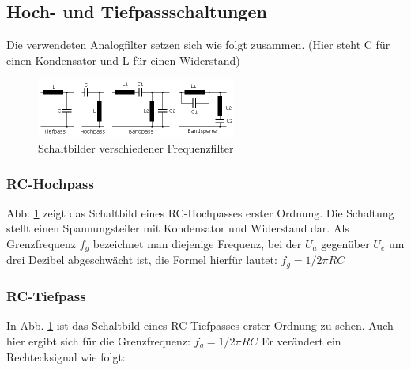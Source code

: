 \subsection{Hoch- und Tiefpassschaltungen}
Die verwendeten Analogfilter setzen sich wie folgt zusammen.
(Hier steht C für einen Kondensator und L für einen Widerstand)
\begin{figure}[H]
    \centering
    \includegraphics[width=\textwidth]{Abb/pass.pdf} 
    \caption{Schaltbilder verschiedener Frequenzfilter}
    \label{pass}
\end{figure}

\subsubsection{RC-Hochpass}
Abb. \ref{pass} zeigt das Schaltbild eines RC-Hochpasses erster Ordnung. Die Schaltung stellt einen Spannungsteiler mit Kondensator und Widerstand dar.
Als Grenzfrequenz $f_g$ bezeichnet man diejenige Frequenz, bei der $U_a$ gegenüber $U_e$ um drei Dezibel abgeschwächt ist, die Formel hierfür lautet: $f_g=1/2\pi R C$

\subsubsection{RC-Tiefpass}

In Abb. \ref{pass} ist das Schaltbild eines RC-Tiefpasses erster Ordnung zu sehen. Auch hier ergibt sich für die Grenzfrequenz: $f_g=1/2 \pi RC$
Er verändert ein Rechtecksignal wie folgt:


